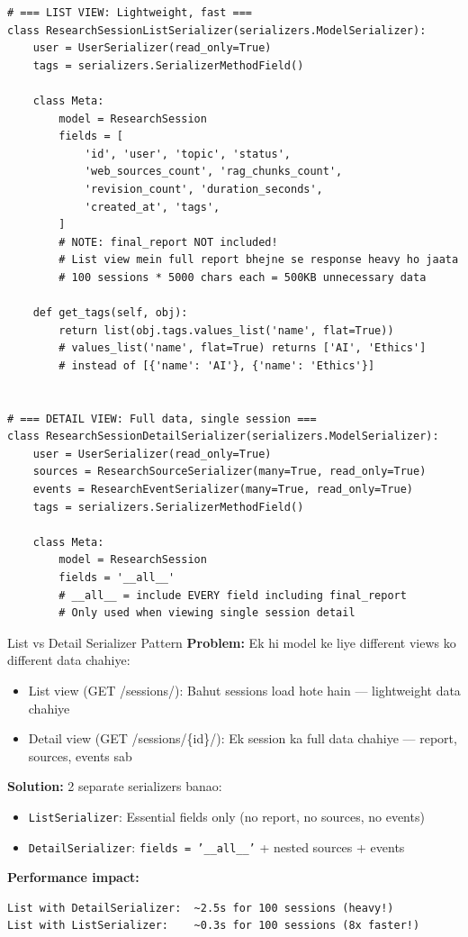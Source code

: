 \documentclass[11pt,a4paper,twoside]{report}
\begin{document}
\begin{lstlisting}[style=pythonstyle,caption={serializers.py --- Session Serializers (List vs Detail)}]
# === LIST VIEW: Lightweight, fast ===
class ResearchSessionListSerializer(serializers.ModelSerializer):
    user = UserSerializer(read_only=True)
    tags = serializers.SerializerMethodField()

    class Meta:
        model = ResearchSession
        fields = [
            'id', 'user', 'topic', 'status',
            'web_sources_count', 'rag_chunks_count',
            'revision_count', 'duration_seconds',
            'created_at', 'tags',
        ]
        # NOTE: final_report NOT included!
        # List view mein full report bhejne se response heavy ho jaata
        # 100 sessions * 5000 chars each = 500KB unnecessary data

    def get_tags(self, obj):
        return list(obj.tags.values_list('name', flat=True))
        # values_list('name', flat=True) returns ['AI', 'Ethics']
        # instead of [{'name': 'AI'}, {'name': 'Ethics'}]


# === DETAIL VIEW: Full data, single session ===
class ResearchSessionDetailSerializer(serializers.ModelSerializer):
    user = UserSerializer(read_only=True)
    sources = ResearchSourceSerializer(many=True, read_only=True)
    events = ResearchEventSerializer(many=True, read_only=True)
    tags = serializers.SerializerMethodField()

    class Meta:
        model = ResearchSession
        fields = '__all__'
        # __all__ = include EVERY field including final_report
        # Only used when viewing single session detail
\end{lstlisting}

\begin{conceptbox}{List vs Detail Serializer Pattern}
\textbf{Problem:} Ek hi model ke liye different views ko different data chahiye:
\begin{itemize}
    \item List view (GET /sessions/): Bahut sessions load hote hain --- lightweight data chahiye
    \item Detail view (GET /sessions/\{id\}/): Ek session ka full data chahiye --- report, sources, events sab
\end{itemize}

\textbf{Solution:} 2 separate serializers banao:
\begin{itemize}
    \item \texttt{ListSerializer}: Essential fields only (no report, no sources, no events)
    \item \texttt{DetailSerializer}: \texttt{fields = '\_\_all\_\_'} + nested sources + events
\end{itemize}

\textbf{Performance impact:}
\begin{lstlisting}[language={}]
List with DetailSerializer:  ~2.5s for 100 sessions (heavy!)
List with ListSerializer:    ~0.3s for 100 sessions (8x faster!)
\end{lstlisting}
\end{conceptbox}
\end{document}
